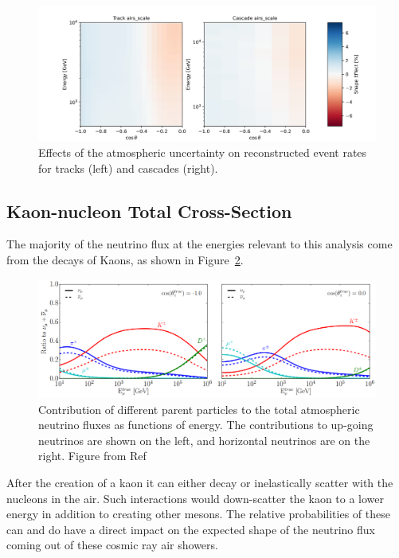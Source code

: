 \documentclass[main.tex]{subfiles}
\begin{document}
\begin{figure}
    \centering
    \includegraphics[width=0.8\linewidth]{figures/systematics/airs_scale.png}
    \caption{Effects of the atmospheric uncertainty on reconstructed event rates for tracks (left) and cascades (right).}\label{fig:airs_reco}
\end{figure}




\subsection{Kaon-nucleon Total Cross-Section}

The majority of the neutrino flux at the energies relevant to this analysis come from the decays of Kaons, as shown in Figure~\ref{fig:parentparty}.

\begin{figure}
    \centering
    \includegraphics[width=0.8\linewidth]{./figures/parent_party.png}
    \caption{Contribution of different parent particles to the total atmospheric neutrino fluxes as functions of energy. The contributions to up-going neutrinos are shown on the left, and horizontal neutrinos are on the right. Figure from Ref~\cite{Aartsen_2020_prd}}\label{fig:parentparty}
\end{figure}

After the creation of a kaon it can either decay or inelastically scatter with the nucleons in the air. 
Such interactions would down-scatter the kaon to a lower energy in addition to creating other mesons. 
The relative probabilities of these can and do have a direct impact on the expected shape of the neutrino flux coming out of these cosmic ray air showers. 
\end{document}
